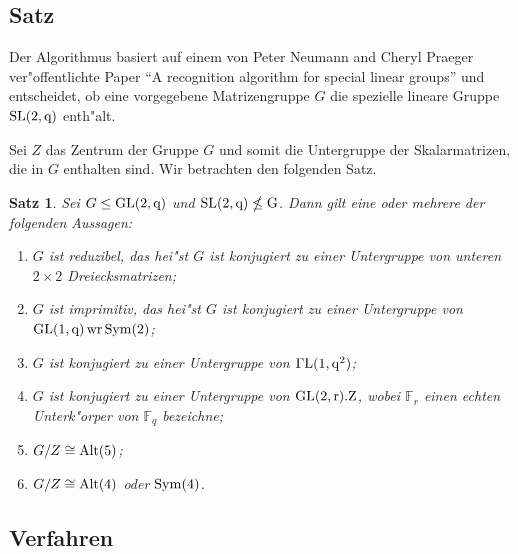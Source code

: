 \documentclass[a4paper,11pt]{article}
\theoremstyle{bla}
\newtheorem*{satz}{Satz}
\begin{document}
\subsection{Satz}

Der Algorithmus basiert auf einem von Peter Neumann and Cheryl Praeger ver"offentlichte Paper "`A recognition algorithm for special linear groups"' \cite{NP92} und entscheidet, ob eine vorgegebene Matrizengruppe $G$ die spezielle lineare Gruppe $\rm{SL}(2,q)$ enth"alt.

Sei $Z$ das Zentrum der Gruppe $G$ und somit die Untergruppe der Skalarmatrizen, die in $G$ enthalten sind. Wir betrachten den folgenden Satz.

\begin{satz}
 Sei $G \leq \rm{GL}(2,q)$ und $\rm{SL}(2,q) \nleq G$. Dann gilt eine oder mehrere der folgenden Aussagen:

  \begin{enumerate}
   \item $G$ ist reduzibel, das hei"st $G$ ist konjugiert zu einer Untergruppe von unteren $2 \times 2$ Dreiecksmatrizen;

   \item $G$ ist imprimitiv, das hei"st $G$ ist konjugiert zu einer Untergruppe von $\rm{GL}(1,q)\, \rm{wr}\, \rm{Sym}(2)$;

   \item $G$ ist konjugiert zu einer Untergruppe von $\Gamma\rm{L}(1,q^{2})$;

   \item $G$ ist konjugiert zu einer Untergruppe von $\rm{GL}(2,r).Z$, wobei $\mathbb{F}_{r}$ einen echten Unterk"orper von $\mathbb{F}_{q}$ bezeichne;

   \item $G/Z \cong \rm{Alt}(5)$;

   \item $G/Z \cong \rm{Alt}(4)$ oder $\rm{Sym}(4)$.
  \end{enumerate}
\end{satz}


\subsection{Verfahren}
\end{document}
